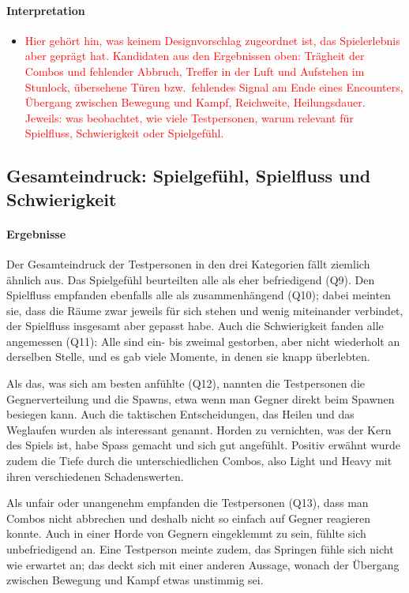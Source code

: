 \documentclass[../Main.tex]{subfiles}
\begin{document}
\paragraph{Interpretation}
\begin{itemize}[leftmargin=1.5cm]
    \item \textcolor{red}{Hier gehört hin, was keinem Designvorschlag zugeordnet ist, das Spielerlebnis aber geprägt hat. Kandidaten aus den Ergebnissen oben: Trägheit der Combos und fehlender Abbruch, Treffer in der Luft und Aufstehen im Stunlock, übersehene Türen bzw.\ fehlendes Signal am Ende eines Encounters, Übergang zwischen Bewegung und Kampf, Reichweite, Heilungsdauer. Jeweils: was beobachtet, wie viele Testpersonen, warum relevant für Spielfluss, Schwierigkeit oder Spielgefühl.}
\end{itemize}

\subsection{Gesamteindruck: Spielgefühl, Spielfluss und Schwierigkeit} \label{sec:Gesamteindruck} \label{sec:ErgAllgemein}

\paragraph{Ergebnisse}
Der Gesamteindruck der Testpersonen in den drei Kategorien fällt ziemlich ähnlich aus. Das Spielgefühl beurteilten alle als eher befriedigend (Q9). Den Spielfluss empfanden ebenfalls alle als zusammenhängend (Q10); dabei meinten sie, dass die Räume zwar jeweils für sich stehen und wenig miteinander verbindet, der Spielfluss insgesamt aber gepasst habe. Auch die Schwierigkeit fanden alle angemessen (Q11): Alle sind ein- bis zweimal gestorben, aber nicht wiederholt an derselben Stelle, und es gab viele Momente, in denen sie knapp überlebten.

Als das, was sich am besten anfühlte (Q12), nannten die Testpersonen die Gegnerverteilung und die Spawns, etwa wenn man Gegner direkt beim Spawnen besiegen kann. Auch die taktischen Entscheidungen, das Heilen und das Weglaufen wurden als interessant genannt. Horden zu vernichten, was der Kern des Spiels ist, habe Spass gemacht und sich gut angefühlt. Positiv erwähnt wurde zudem die Tiefe durch die unterschiedlichen Combos, also Light und Heavy mit ihren verschiedenen Schadenswerten.

Als unfair oder unangenehm empfanden die Testpersonen (Q13), dass man Combos nicht abbrechen und deshalb nicht so einfach auf Gegner reagieren konnte. Auch in einer Horde von Gegnern eingeklemmt zu sein, fühlte sich unbefriedigend an. Eine Testperson meinte zudem, das Springen fühle sich nicht wie erwartet an; das deckt sich mit einer anderen Aussage, wonach der Übergang zwischen Bewegung und Kampf etwas unstimmig sei.
\end{document}
